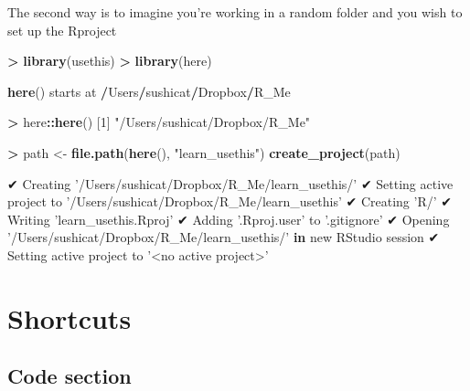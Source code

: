 \documentclass[]{book}
\newenvironment{Shaded}{\begin{snugshade}}{\end{snugshade}}
\newcommand{\ControlFlowTok}[1]{\textcolor[rgb]{0.13,0.29,0.53}{\textbf{#1}}}
\newcommand{\DecValTok}[1]{\textcolor[rgb]{0.00,0.00,0.81}{#1}}
\newcommand{\KeywordTok}[1]{\textcolor[rgb]{0.13,0.29,0.53}{\textbf{#1}}}
\newcommand{\NormalTok}[1]{#1}
\newcommand{\OperatorTok}[1]{\textcolor[rgb]{0.81,0.36,0.00}{\textbf{#1}}}
\newcommand{\StringTok}[1]{\textcolor[rgb]{0.31,0.60,0.02}{#1}}
\begin{document}
The second way is to imagine you're working in a random folder and you wish to set up the Rproject

\begin{Shaded}
\begin{Highlighting}[]
\OperatorTok{>}\StringTok{ }\KeywordTok{library}\NormalTok{(usethis)}
\OperatorTok{>}\StringTok{ }\KeywordTok{library}\NormalTok{(here)}

\KeywordTok{here}\NormalTok{() starts at }\OperatorTok{/}\NormalTok{Users}\OperatorTok{/}\NormalTok{sushicat}\OperatorTok{/}\NormalTok{Dropbox}\OperatorTok{/}\NormalTok{R_Me}
\end{Highlighting}
\end{Shaded}

\begin{Shaded}
\begin{Highlighting}[]
\OperatorTok{>}\StringTok{ }\NormalTok{here}\OperatorTok{::}\KeywordTok{here}\NormalTok{()}
\NormalTok{[}\DecValTok{1}\NormalTok{] }\StringTok{"/Users/sushicat/Dropbox/R_Me"}
\end{Highlighting}
\end{Shaded}

\begin{Shaded}
\begin{Highlighting}[]
\OperatorTok{>}\StringTok{ }\NormalTok{path <-}\StringTok{ }\KeywordTok{file.path}\NormalTok{(}\KeywordTok{here}\NormalTok{(), }\StringTok{"learn_usethis"}\NormalTok{)}
\KeywordTok{create_project}\NormalTok{(path)}

\NormalTok{✔ Creating }\StringTok{'/Users/sushicat/Dropbox/R_Me/learn_usethis/'}
\NormalTok{✔ Setting active project to }\StringTok{'/Users/sushicat/Dropbox/R_Me/learn_usethis'}
\NormalTok{✔ Creating }\StringTok{'R/'}
\NormalTok{✔ Writing }\StringTok{'learn_usethis.Rproj'}
\NormalTok{✔ Adding }\StringTok{'.Rproj.user'}\NormalTok{ to }\StringTok{'.gitignore'}
\NormalTok{✔ Opening }\StringTok{'/Users/sushicat/Dropbox/R_Me/learn_usethis/'} \ControlFlowTok{in}\NormalTok{ new RStudio session}
\NormalTok{✔ Setting active project to }\StringTok{'<no active project>'}
\end{Highlighting}
\end{Shaded}

\hypertarget{shortcuts}{%
\chapter{Shortcuts}\label{shortcuts}}

\hypertarget{code-section}{%
\section{Code section}\label{code-section}}
\end{document}
